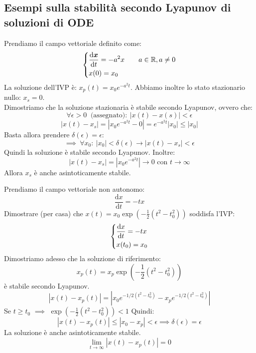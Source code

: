 \subsection{Esempi sulla stabilità secondo Lyapunov di soluzioni di ODE}%
\label{sub:Esempi sulla stabilità secondo Lyapunov di soluzioni di ODE}
\begin{exmp}[1]
    Prendiamo il campo vettoriale definito come:
    \[\begin{dcases}
        \frac{\text{d} \boldsymbol{x}}{\text{d} t} = - a^2x \qquad a \in \mathbb{R}, a\neq 0\\
	x(0)=x_0	
    \end{dcases}\] 
    La soluzione dell'IVP è: $x_p(t)= x_0e^{-a^2t}$. Abbiamo inoltre lo stato stazionario nullo: $x_s = 0$. \\
    Dimostriamo che la soluzione stazionaria è stabile secondo Lyapunov, ovvero che:
    \[
	\forall \epsilon>0  \  \text{ (assegnato)}: \ \left|x(t)-x(s)\right|<\epsilon
    \] 
    \[
	\left|x(t)-x_s\right|= \left|x_0e^{-a^2t}-0\right| = e^{-a^2t}\left|x_0\right| \le \left|x_0\right|
    \] 
    Basta allora prendere $\delta (\epsilon)=\epsilon$:
    \[
	\implies  \ \forall x_0: \ \left|x_0\right|<\delta (\epsilon) \to \left|x(t)-x_s\right|<\epsilon
    \] 
    Quindi la soluzione è stabile secondo Lyapunov. Inoltre:
    \[
	\left|x(t)-x_s\right|=\left|x_0e^{-a^2t}\right|\to 0 \text{ con } t\to \infty
    \] 
    Allora $x_s$ è anche asintoticamente stabile.
\end{exmp}
\noindent
\begin{exmp}[2]
    Prendiamo il campo vettoriale non autonomo:
    \[
        \frac{\text{d} x}{\text{d} t} = - tx
    \] 
    Dimostrare (per casa) che $x(t)= x_0\exp\left(-\frac{1}{2}(t^2-t_0^2)\right)$ soddisfa l'IVP:
    \[\begin{dcases}
        \frac{\text{d} x}{\text{d} t} = -tx\\
	x(t_0)= x_0
    \end{dcases}\] 
    Dimostriamo adesso che la soluzione di riferimento:
    \[
        x_p(t)= x_p\exp\left(-\frac{1}{2}(t^2-t_0^2)\right)
    \] 
    è stabile secondo Lyapunov.
    \[
	\left|x(t)-x_p(t)\right|= \left|x_0e^{-1 /2(t^2-t_0^2)} - x_pe^{-1 /2(t^2-t_0^2)}\right|
    \] 
    Se $t\ge t_0$ $\implies$ $\exp \left(- \frac{1}{2}(t^2-t_0^2)\right)<1$ Quindi:
    \[
	\left|x(t)-x_p(t)\right|\le \left|x_0-x_p\right|< \epsilon  \implies  \delta (\epsilon)=\epsilon
    \] 
    La soluzione è anche asintoticamente stabile.
    \[
	\lim_{t \to \infty} \left|x(t)-x_p(t)\right| = 0
    \] 
\end{exmp}
